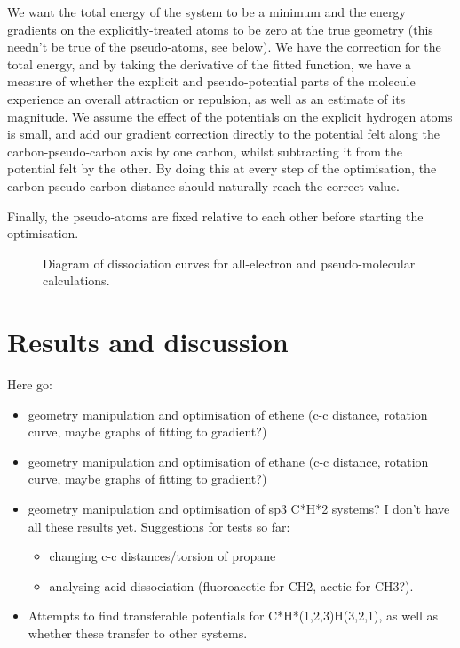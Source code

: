 \documentclass[aip,reprint]{revtex4-1}
\begin{document}
 We want the total energy of the system to be a minimum and the energy gradients on the explicitly-treated atoms to be zero at the true geometry (this needn't be true of the pseudo-atoms, see below). We have the correction for the total energy, and by taking the derivative of the fitted function, we have a measure of whether the explicit and pseudo-potential parts of the molecule experience an overall attraction or repulsion, as well as an estimate of its magnitude. We assume the effect of the potentials on the explicit hydrogen atoms is small, and add our gradient correction directly to the potential felt along the carbon-pseudo-carbon axis by one carbon, whilst subtracting it from the potential felt by the other. By doing this at every step of the optimisation, the carbon-pseudo-carbon distance should naturally reach the correct value.	
 		 
 Finally, the pseudo-atoms are fixed relative to each other before starting the optimisation.		
 		 
\begin{figure}		 
\begin{center}		 
\end{center}		
\vspace{0.25in}		 
\hspace*{3in}		
\caption{Diagram of dissociation curves for all-electron and pseudo-molecular calculations.}		
\label{figure:dissociation_diagram}
\end{figure}		

\section{Results and discussion}

Here go:

\begin{itemize}
\item geometry manipulation and optimisation of ethene (c-c distance, rotation curve, maybe graphs of fitting to gradient?)
\item geometry manipulation and optimisation of ethane (c-c distance, rotation curve, maybe graphs of fitting to gradient?)
\item geometry manipulation and optimisation of sp3 C*H*2 systems? I don't have all these results yet. Suggestions for tests so far:
\begin{itemize}
\item changing c-c distances/torsion of propane
\item analysing acid dissociation (fluoroacetic for CH2, acetic for CH3?).
\end{itemize}
\item Attempts to find transferable potentials for C*H*(1,2,3)H(3,2,1), as well as whether these transfer to other systems.
\end{itemize}
\end{document}
